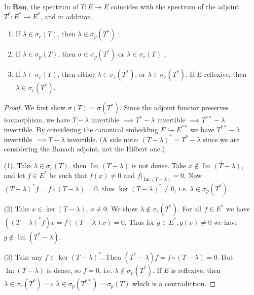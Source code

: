 \begin{proposition}
	\label{prop:SpectrumBanachDual}
	In $\mathbf{Ban}$, the spectrum of $T: E \to E$ coincides with the spectrum of the adjoint $T^*: E^* \to E^*$, and in addition,
	\begin{enumerate}
		\item If $\lambda \in \sigma_r(T)$, then $\lambda \in \sigma_p(T^*)$ ;
		\item If $\lambda \in \sigma_p(T)$, then $\sigma \in \sigma_p(T^*)$ or $\lambda \in \sigma_r(T)$ ;
		\item If $\lambda \in \sigma_c(T)$, then either $\lambda \in \sigma_c(T^*)$, or $\lambda \in \sigma_r(T^*)$. If $E$ reflexive, then $\lambda \in \sigma_c(T^*)$.
	\end{enumerate}
\end{proposition}
\begin{proof}
	We first show $\sigma(T) = \sigma(T^*)$. Since the adjoint functor preserves isomorphism, we have $T - \lambda$ invertible $\implies T^* - \lambda$ invertible $\implies T^{* *} - \lambda$ invertible. By considering the canonical embedding $E \hookrightarrow E^{* *}$ we have $T^{* *} - \lambda$ invertible $\implies T -  \lambda$ invertible. (A side note: $(T - \lambda)^* = T^* - \lambda$ since we are considering the Banach adjoint, not the Hilbert one.)

	(1). Take $\lambda \in \sigma_r(T)$, then $\operatorname{Im} (T - \lambda)$ is not dense. Take $x \not\in \overline{\operatorname{Im} (T - \lambda)} $, and let $f \in E^*$ be such that $f(x) \neq 0$ and $f|_{\operatorname{Im} (T - \lambda)} = 0$. Now $(T - \lambda)^* f = f \circ (T - \lambda) = 0$, thus $\operatorname{ker} (T - \lambda)^* \neq 0$, i.e. $\lambda \in \sigma_p(T^*)$.

	(2) Take $x \in \operatorname{ker} (T - \lambda)$, $x \neq 0$. We show $\lambda \not\in \sigma_c(T^*)$. For all $f \in E^*$ we have $ ((T - \lambda)^* f)x = f\left( (T - \lambda) x \right)  =0$. Thus for $g \in E^*, g(x) \neq 0$ we have $g \not\in \overline{\operatorname{Im} (T^* - \lambda)} $.

	(3) Take any $f \in \operatorname{ker} (T - \lambda)^*$. Then $(T^* - \lambda) f = f\circ (T - \lambda) = 0$. But $\operatorname{Im} (T - \lambda)$ is dense, so $f = 0$, i.e. $\lambda \not\in \sigma_p(T^*)$. If $E$ is reflexive, then $\lambda \in \sigma_r(T^*) \implies \lambda \in \sigma_p(T^{* *}) = \sigma_p(T)$ which is a contradiction.
\end{proof}



